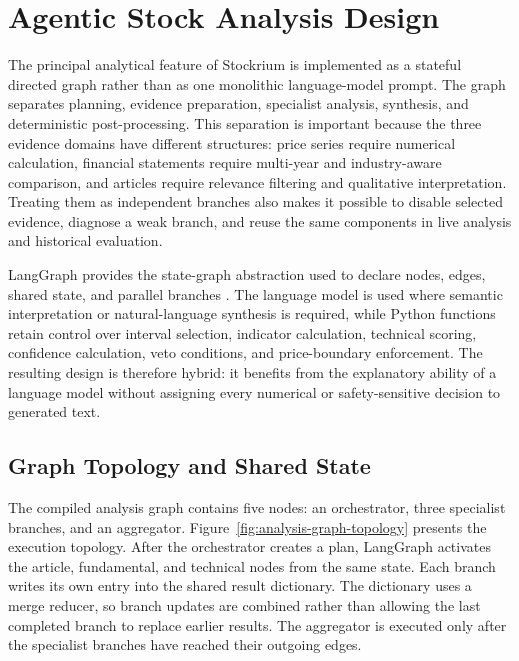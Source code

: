 \section{Agentic Stock Analysis Design}
\label{sec:agentic-stock-analysis-design}

The principal analytical feature of Stockrium is implemented as a stateful directed graph rather than as one monolithic language-model prompt. The graph separates planning, evidence preparation, specialist analysis, synthesis, and deterministic post-processing. This separation is important because the three evidence domains have different structures: price series require numerical calculation, financial statements require multi-year and industry-aware comparison, and articles require relevance filtering and qualitative interpretation. Treating them as independent branches also makes it possible to disable selected evidence, diagnose a weak branch, and reuse the same components in live analysis and historical evaluation.

LangGraph provides the state-graph abstraction used to declare nodes, edges, shared state, and parallel branches \cite{langgraph2026graphapi}. The language model is used where semantic interpretation or natural-language synthesis is required, while Python functions retain control over interval selection, indicator calculation, technical scoring, confidence calculation, veto conditions, and price-boundary enforcement. The resulting design is therefore hybrid: it benefits from the explanatory ability of a language model without assigning every numerical or safety-sensitive decision to generated text.

\subsection{Graph Topology and Shared State}
\label{subsec:analysis-graph-state}

The compiled analysis graph contains five nodes: an orchestrator, three specialist branches, and an aggregator. Figure~\ref{fig:analysis-graph-topology} presents the execution topology. After the orchestrator creates a plan, LangGraph activates the article, fundamental, and technical nodes from the same state. Each branch writes its own entry into the shared result dictionary. The dictionary uses a merge reducer, so branch updates are combined rather than allowing the last completed branch to replace earlier results. The aggregator is executed only after the specialist branches have reached their outgoing edges.

